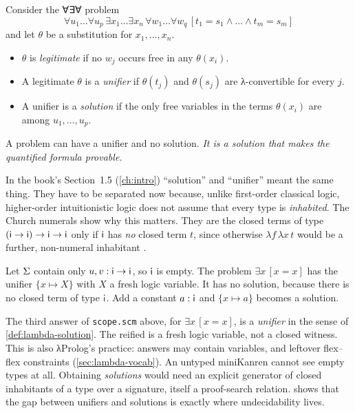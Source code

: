 {\begin{definition}\label{def:lambda-solution}\hfill\break
Consider the ∀∃∀ problem
\[\forall u_1\dots\forall u_p\,\exists x_1\dots\exists x_n\,\forall w_1\dots\forall w_q\,[t_1=s_1\wedge\dots\wedge t_m=s_m]\]
and let $\theta$ be a substitution for $x_1,\dots,x_n$.
\begin{itemize}[nosep]
\item $\theta$ is \emph{legitimate} if no $w_j$ occurs free in any $\theta(x_i)$.
\item A legitimate $\theta$ is a \emph{unifier} if $\theta(t_j)$ and $\theta(s_j)$ are λ-convertible for
      every $j$.
\item A unifier is a \emph{solution} if the only free variables in the terms $\theta(x_i)$ are among
      $u_1,\dots,u_p$.
\end{itemize}
A problem can have a unifier and no solution. \emph{It is a solution that makes the quantified formula
provable.}
\end{definition}

In the book's Section~1.5 (\cref{ch:intro}) \enquote{solution} and \enquote{unifier} meant the same thing. They have to be separated
now because, unlike first-order classical logic, higher-order intuitionistic logic does not assume that
every type is \emph{inhabited}. The Church numerals show why this matters. They are the closed terms of
type $(\mathsf{i}\to\mathsf{i})\to\mathsf{i}\to\mathsf{i}$ only if $\mathsf{i}$ has \emph{no} closed term $t$, since
otherwise $\lambda f\,\lambda x\,t$ would be a further, non-numeral inhabitant .

\begin{example}
Let $\Sigma$ contain only $u,v:\mathsf{i}\to\mathsf{i}$, so $\mathsf{i}$ is empty. The problem $\exists x\,[x=x]$
has the unifier $\{x\mapsto X\}$ with $X$ a fresh logic variable. It has no solution, because there is
no closed term of type $\mathsf{i}$. Add a constant $a:\mathsf{i}$ and $\{x\mapsto a\}$ becomes a solution.
\end{example}

\begin{kanren}
The third answer of \texttt{scope.scm} above,  for $\exists x\,[x=x]$, is a
\emph{unifier} in the sense of \cref{def:lambda-solution}. The reified  is a fresh logic
variable, not a closed witness. This is also λProlog's practice: answers may contain variables, and
leftover flex–flex constraints (\cref{sec:lambda-vocab}). An untyped miniKanren cannot see empty types
at all. Obtaining \emph{solutions} would need an explicit generator of closed inhabitants of a type
over a signature, itself a proof-search relation.  shows that the gap
between unifiers and solutions is exactly where undecidability lives.
\end{kanren}

}
